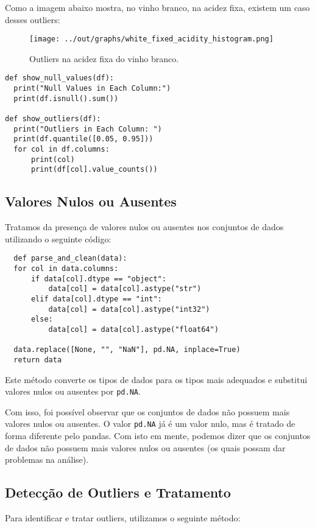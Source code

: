 \documentclass{article}
\begin{document}
Como a imagem abaixo mostra, no vinho branco, na acidez fixa, existem um caso desses outliers:

\begin{figure}[ht]
  \centering
  \texttt{[image: ../out/graphs/white\_fixed\_acidity\_histogram.png]}
  \caption{Outliers na acidez fixa do vinho branco.}
  \label{fig:outliers_white_fixed_acidity}
\end{figure}

\begin{verbatim}
def show_null_values(df):
  print("Null Values in Each Column:")
  print(df.isnull().sum())

def show_outliers(df):
  print("Outliers in Each Column: ")
  print(df.quantile([0.05, 0.95]))
  for col in df.columns:
      print(col)
      print(df[col].value_counts())
\end{verbatim}

\subsection{Valores Nulos ou Ausentes}
Tratamos da presença de valores nulos ou ausentes nos conjuntos de dados utilizando o seguinte código:

\begin{verbatim}
  def parse_and_clean(data):
  for col in data.columns:
      if data[col].dtype == "object":
          data[col] = data[col].astype("str")
      elif data[col].dtype == "int":
          data[col] = data[col].astype("int32")
      else:
          data[col] = data[col].astype("float64")

  data.replace([None, "", "NaN"], pd.NA, inplace=True)
  return data
\end{verbatim}

Este método converte os tipos de dados para os tipos mais adequados e substitui valores nulos ou ausentes por \texttt{pd.NA}.

Com isso, foi possível observar que os conjuntos de dados não possuem mais valores nulos ou ausentes. O valor \texttt{pd.NA} já é um valor nulo, mas é tratado de forma diferente pelo pandas. Com isto em mente, podemos dizer que os conjuntos de dados não possuem mais valores nulos ou ausentes (os quais possam dar problemas na análise).

\subsection{Detecção de Outliers e Tratamento}
Para identificar e tratar outliers, utilizamos o seguinte método:
\end{document}
